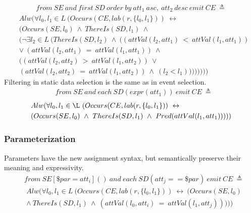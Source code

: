 \begin{align*}%
from\ SE\ and\ first\ SD\ order\ by\ att_1\ asc,\ att_2\ desc\ emit\ CE\ \triangleq
\end{align*}
\begin{align*}
&Alw(\forall l_0, l_1 \in L\ (Occurs(CE, lab(r, \{l_0, l_1\}))\ \leftrightarrow\\
&(Occurs(SE, l_0)\ \wedge\ ThereIs(SD, l_1)\ \wedge\\
&(\neg \exists l_2 \in L\ (ThereIs(SD, l_2)\ \wedge\ ((attVal(l_2, att_1)\ <\ attVal(l_1, att_1))\\
&\lor\ (attVal(l_2, att_1)\ =\ attVal(l_1, att_1))\ \wedge\\
&((attVal(l_2, att_2)\ >\ attVal(l_1, att_2))\ \lor\\
&(attVal(l_2, att_2)\ =\ attVal(l_1, att_2))\ \wedge\ (l_2 < l_1))))))))
\end{align*}
Filtering in static data selection is the same as in event selection.
\begin{align*}%
&from\ SE\ and\ each\ SD(expr(att_1))\ emit\ CE\ \triangleq
\end{align*}
\begin{align*}
&Alw(\forall l_0, l_1 \in \L\ (Occurs(CE, lab(r, \{l_0, l_1\}))\ \leftrightarrow\\
&(Occurs(SE, l_0)\ \wedge\ ThereIs(SD, l_1)\ \wedge\ Pred(attVal(l_1, att_1)))))
\end{align*}

\subsubsection{Parameterization}
Parameters have the new assignment syntax, but semantically preserve their meaning and expressivity.
\begin{align*}%
&from\ SE[\$par = att_i]()\ and\ each\ SD(att_j == \$par)\ emit\ CE\ \triangleq
\end{align*}
\begin{align*}
&Alw(\forall l_0, l_1 \in L\ (Occurs(CE, lab(r, \{l_0, l_1\}))\ \leftrightarrow\ (Occurs(SE, l_0)\\
&\wedge\ ThereIs(SD, l_1)\ \wedge\ (attVal(l_0, att_i)\ =\ attVal(l_1, att_j)))))
\end{align*}

